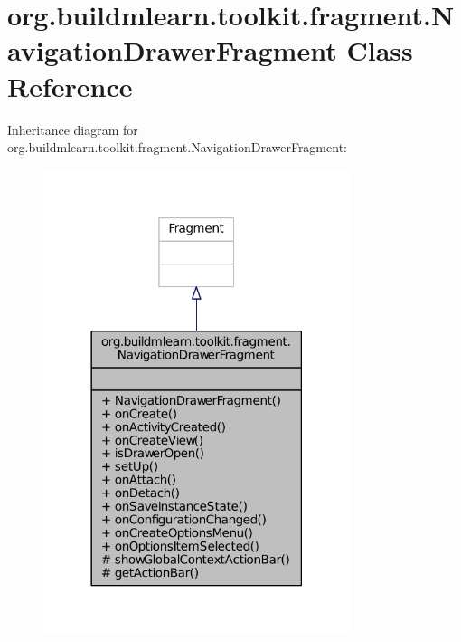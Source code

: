\hypertarget{classorg_1_1buildmlearn_1_1toolkit_1_1fragment_1_1NavigationDrawerFragment}{\section{org.\-buildmlearn.\-toolkit.\-fragment.\-Navigation\-Drawer\-Fragment Class Reference}
\label{classorg_1_1buildmlearn_1_1toolkit_1_1fragment_1_1NavigationDrawerFragment}
}


Inheritance diagram for org.\-buildmlearn.\-toolkit.\-fragment.\-Navigation\-Drawer\-Fragment\-:
\nopagebreak
\begin{figure}[H]
\begin{center}
\leavevmode
\includegraphics[width=254pt]{d7/ddf/classorg_1_1buildmlearn_1_1toolkit_1_1fragment_1_1NavigationDrawerFragment__inherit__graph}
\end{center}
\end{figure}


